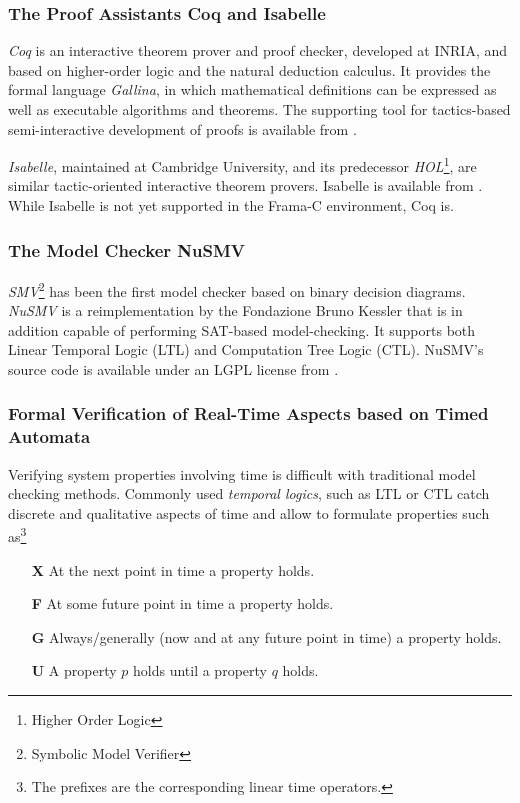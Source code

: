 \documentclass{template/openetcs_report}
\begin{document}
\subsubsection{The Proof Assistants Coq and Isabelle}


{\em Coq} is an interactive theorem prover and proof checker,
developed at INRIA, and based on
higher-order logic and the natural deduction calculus.
%
It provides the formal language {\em Gallina}, in which
mathematical definitions can be expressed as well as
executable algorithms and theorems.
%
The supporting tool for tactics-based semi-interactive development of
proofs is available from \cite{coq}.
%

{\em Isabelle}, maintained at Cambridge University,
and its predecessor {\em HOL}\footnote{
        Higher Order Logic
},
are similar tactic-oriented interactive theorem provers.
%
Isabelle is available from \cite{isabelle}.
%
While Isabelle is not yet supported in the Frama-C environment,
Coq is.


\subsubsection{The Model Checker NuSMV}

{\em SMV}\footnote{
        Symbolic Model Verifier
}
has been the first model checker based on binary decision
diagrams.
%
{\em NuSMV} is a reimplementation by the Fondazione Bruno Kessler
that is in addition capable of
performing SAT-based model-checking.
%
It supports both
Linear Temporal Logic (LTL) and Computation Tree Logic (CTL).
%
NuSMV's source code is available under an LGPL license from
\cite{nusmv}.


\subsubsection{Formal Verification of Real-Time Aspects based on Timed Automata}
\label{sct:twt:descrTA}


Verifying system properties involving time is difficult with traditional model checking methods. Commonly used \emph{temporal logics}, such as LTL or CTL catch discrete and qualitative aspects of time and allow to formulate properties such as\footnote{The prefixes are the corresponding linear time operators.}
\begin{itemize}
  \item[\bf X] At the next point in time a property holds.
  \item[\bf F] At some future point in time a property holds.
  \item[\bf G] Always/generally (now and at any future point in time) a property holds.
  \item[\bf U] A property $p$ holds until a property $q$ holds.
\end{itemize}
\end{document}
